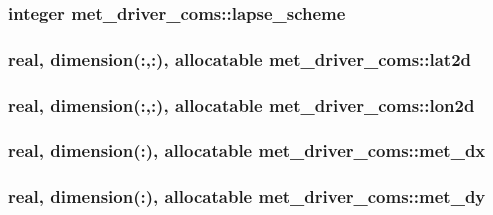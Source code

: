 \subsubsection[{\texorpdfstring{lapse\+\_\+scheme}{lapse_scheme}}]{\setlength{\rightskip}{0pt plus 5cm}integer met\+\_\+driver\+\_\+coms\+::lapse\+\_\+scheme}\hypertarget{namespacemet__driver__coms_ae37a372059ee47809fc1211fac945fd9}{}\label{namespacemet__driver__coms_ae37a372059ee47809fc1211fac945fd9}
\subsubsection[{\texorpdfstring{lat2d}{lat2d}}]{\setlength{\rightskip}{0pt plus 5cm}real, dimension(\+:,\+:), allocatable met\+\_\+driver\+\_\+coms\+::lat2d}\hypertarget{namespacemet__driver__coms_ad4ba08a0bb7a7d239acca24ad643df43}{}\label{namespacemet__driver__coms_ad4ba08a0bb7a7d239acca24ad643df43}
\subsubsection[{\texorpdfstring{lon2d}{lon2d}}]{\setlength{\rightskip}{0pt plus 5cm}real, dimension(\+:,\+:), allocatable met\+\_\+driver\+\_\+coms\+::lon2d}\hypertarget{namespacemet__driver__coms_a86a7d638d5a38f95de4804d9e6b72f86}{}\label{namespacemet__driver__coms_a86a7d638d5a38f95de4804d9e6b72f86}
\subsubsection[{\texorpdfstring{met\+\_\+dx}{met_dx}}]{\setlength{\rightskip}{0pt plus 5cm}real, dimension(\+:), allocatable met\+\_\+driver\+\_\+coms\+::met\+\_\+dx}\hypertarget{namespacemet__driver__coms_a668ed875098df886a584635cacc54975}{}\label{namespacemet__driver__coms_a668ed875098df886a584635cacc54975}
\subsubsection[{\texorpdfstring{met\+\_\+dy}{met_dy}}]{\setlength{\rightskip}{0pt plus 5cm}real, dimension(\+:), allocatable met\+\_\+driver\+\_\+coms\+::met\+\_\+dy}\hypertarget{namespacemet__driver__coms_aef439931abb5d16ef45ab6a678c931a6}{}\label{namespacemet__driver__coms_aef439931abb5d16ef45ab6a678c931a6}
